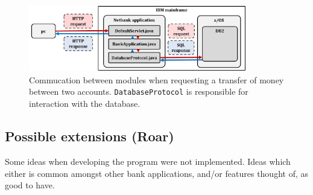 \begin{figure}[H]
\centering
\includegraphics[width = 0.85\textwidth]{figures/interaction_transfer.pdf}
\caption{Commucation between modules when requesting a transfer of money between two accounts. \texttt{DatabaseProtocol} is responsible for interaction with the database.}
\end{figure}


\subsection{Possible extensions (Roar)}

Some ideas when developing the program were not implemented. Ideas which either is common amongst other bank applications, and/or features thought of, as good to have.

